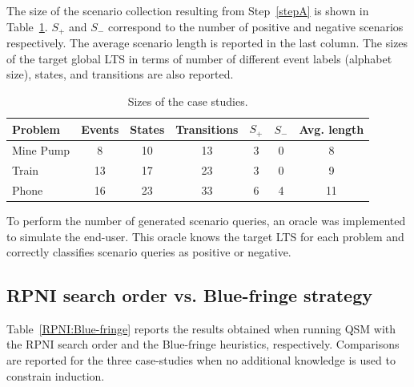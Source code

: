 The size of the scenario collection resulting from Step~\ref{stepA} is shown in Table~\ref{CaseStudies}. $S_+$ and $S_-$ correspond to the number of positive and negative scenarios respectively. The average scenario length is reported in the last column. The sizes of the target global LTS in terms of number of different event labels (alphabet size), states, and transitions are also reported. 

\begin{table}[H]
\centering
\begin{tabular}{|l||c|c|c||c|c|c|}\hline
Problem  & Events & States & Transitions & $S_+$ & $S_-$ & Avg. length\\\hline\hline
Mine Pump& 8      & 10     & 13          & 3     & 0     & 8\\\hline
Train    & 13     & 17     & 23          & 3     & 0     & 9\\\hline
Phone    & 16     & 23     & 33          & 6     & 4     & 11\\\hline
\end{tabular}
\caption{Sizes of the case studies.\label{CaseStudies}}
\end{table} 

To perform the number of generated scenario queries, an oracle was implemented to simulate the end-user. This oracle knows the target LTS for each problem and correctly classifies scenario queries as positive or negative.


\subsection{RPNI search order vs. Blue-fringe strategy\label{subsection:evaluation-bluefringe-on-casestudies}}

Table~\ref{RPNI:Blue-fringe} reports the results obtained when running QSM with the RPNI search order and the Blue-fringe heuristics, respectively. Comparisons are reported for the three case-studies when no additional knowledge is used to constrain induction. 

